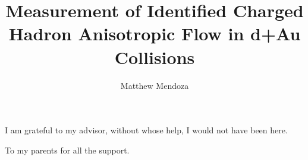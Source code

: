 \documentclass[oneside,final, letterpaper]{ucr}
\begin{document}

\title{Measurement of Identified Charged Hadron Anisotropic Flow in d+Au Collisions}
\author{Matthew Mendoza}

\maketitle
\copyrightpage{}
\approvalpage{}


\begin{frontmatter}

\begin{acknowledgements}
I am grateful to my advisor, without whose help, I would not have been here.
\end{acknowledgements}

\begin{dedication}
\null\vfil
{\large
\begin{center}
To my parents for all the support.
\end{center}}
\vfil\null
\end{dedication}



\tableofcontents
\listoffigures
\listoftables
\end{frontmatter}

\dsp















\nocite{*}
%
\ssp
 
 
\end{document}
